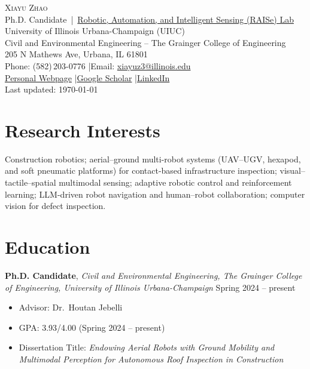 \documentclass[11pt,a4paper]{article}
\newcommand{\entrytitle}[1]{\textbf{#1}}
\newcommand{\entrydetail}[1]{\textit{#1}}
\begin{document}
\begin{center}
    {\LARGE\textsc{Xiayu Zhao}} \\[6pt]
    Ph.D. Candidate \,|\, \href{https://raiselab.cee.illinois.edu/}{Robotic, Automation, and Intelligent Sensing (RAISe) Lab} \\
    University of Illinois Urbana-Champaign (UIUC) \\
    Civil and Environmental Engineering -- The Grainger College of Engineering \\
    205 N Mathews Ave, Urbana, IL 61801 \\[4pt]
    Phone: (582)\,203-0776 \quad|\quad Email: \href{mailto:xiayuz3@illinois.edu}{xiayuz3@illinois.edu} \\[2pt]
    \href{https://xiayu-zhao.github.io/}{Personal Webpage} \quad|\quad \href{https://scholar.google.com/citations?user=a1trBDoAAAAJ&hl=en}{Google Scholar} \quad|\quad \href{https://www.linkedin.com/in/xiayuzhao}{LinkedIn}
    \\[4pt]
    {\small Last updated: \today}
\end{center}

\section{Research Interests}

Construction robotics; aerial--ground multi-robot systems (UAV--UGV, hexapod, and soft pneumatic platforms) for contact-based infrastructure inspection; visual--tactile--spatial multimodal sensing; adaptive robotic control and reinforcement learning; LLM-driven robot navigation and human--robot collaboration; computer vision for defect inspection.

\section{Education}

\entrytitle{Ph.D. Candidate}, \entrydetail{Civil and Environmental Engineering, The Grainger College of Engineering, University of Illinois Urbana-Champaign} \hfill Spring 2024 -- present \\[-1.5em]
\begin{itemize}[nosep, leftmargin=1.5em]
    \item Advisor: Dr.\ Houtan Jebelli
    \item GPA: 3.93/4.00 (Spring 2024 -- present)
    \item Dissertation Title: \entrydetail{Endowing Aerial Robots with Ground Mobility and Multimodal Perception for Autonomous Roof Inspection in Construction}
\end{itemize}
\end{document}
